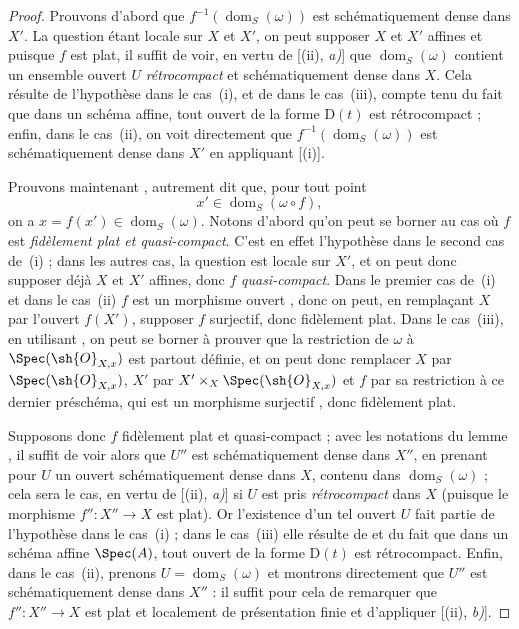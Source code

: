 \begin{proof}
Prouvons d'abord que $f^{-1}(\operatorname{dom}_S(\omega))$ est schématiquement dense dans $X'$.
La question étant locale sur $X$ et $X'$, on peut supposer $X$ et $X'$ affines et puisque $f$ est plat, il suffit de voir, en vertu de [(ii), \emph{a)}] que $\operatorname{dom}_S(\omega)$ contient un ensemble ouvert $U$ \emph{rétrocompact} et schématiquement dense dans $X$.
Cela résulte de l'hypothèse dans le cas~(i), et de  dans le cas~(iii), compte tenu du fait que dans un schéma affine, tout ouvert de la forme $\mathrm{D}(t)$ est rétrocompact ; enfin, dans le cas~(ii), on voit directement que $f^{-1}(\operatorname{dom}_S(\omega))$ est schématiquement dense dans $X'$ en appliquant [(i)].

Prouvons maintenant , autrement dit que, pour tout point
\[
  x'\in\operatorname{dom}_S(\omega\circ f),
\]
on a $x=f(x')\in\operatorname{dom}_S(\omega)$.
Notons d'abord qu'on peut se borner au cas où $f$ est \emph{fidèlement plat et quasi-compact}.
C'est en effet l'hypothèse dans le second cas de~(i) ; dans les autres cas, la question est locale sur $X'$, et on peut donc supposer déjà $X$ et $X'$ affines, donc $f$ \emph{quasi-compact}.
Dans le premier cas de~(i) et dans le cas~(ii) $f$ est un morphisme ouvert , donc on peut, en remplaçant $X$ par l'ouvert $f(X')$, supposer $f$ surjectif, donc fidèlement plat.
Dans le cas~(iii), en utilisant , on peut se borner à prouver que la restriction de $\omega$ à $\Spec(\sh{O}_{X,x})$ est partout définie, et on peut donc remplacer $X$ par $\Spec(\sh{O}_{X,x})$, $X'$ par $X'\times_X\Spec(\sh{O}_{X,x})$ et $f$ par sa restriction à ce dernier préschéma, qui est un morphisme surjectif , donc fidèlement plat.

Supposons donc $f$ fidèlement plat et quasi-compact ; avec les notations du lemme , il suffit de voir alors que $U''$ est schématiquement dense dans $X''$, en prenant pour $U$ un ouvert schématiquement dense dans $X$, contenu dans $\operatorname{dom}_S(\omega)$ ; cela sera le cas, en vertu de [(ii), \emph{a)}] si $U$ est pris \emph{rétrocompact} dans $X$ (puisque le morphisme $f'':X''\to X$ est plat).
Or l'existence d'un tel ouvert $U$ fait partie de l'hypothèse dans le cas~(i) ; dans le cas~(iii) elle résulte de  et du fait que dans un schéma affine $\Spec(A)$, tout ouvert de la forme $\mathrm{D}(t)$ est rétrocompact.
Enfin, dans le cas~(ii), prenons $U=\operatorname{dom}_S(\omega)$ et montrons directement que $U''$ est schématiquement dense dans $X''$ : il suffit pour cela de remarquer que $f'':X''\to X$ est plat et localement de présentation finie et d'appliquer [(ii), \emph{b)}].
\end{proof}

